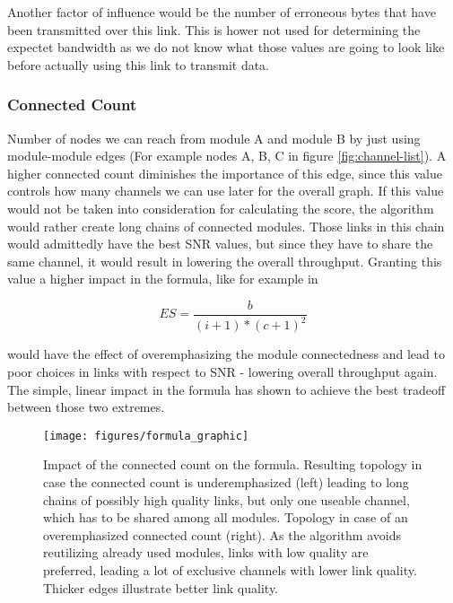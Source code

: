 	Another factor of influence would be the number of erroneous bytes that have been transmitted over this link. 
	This is hower not used for determining the expectet bandwidth as we do not know what those values are going to 
	look like before actually using this link to transmit data.
	
\newpage

      \subsubsection{Connected Count}
	Number of nodes we can reach from module A and module B by just using module-module edges (For example nodes A, B, C in figure \ref{fig:channel-list}). 
	A higher connected count diminishes the importance of this edge, since this value controls how many channels we can use later for the overall graph.
	If this value would not be taken into consideration for calculating the score, the algorithm would rather create long chains of connected modules. 
	Those links in this chain would admittedly have the best \ac{SNR} values, but since they have to share the same channel, 
	it would result in lowering the overall throughput. Granting this value a higher impact in the formula, like for example in 
	
	\begin{equation}
	  ES=\frac{b}{(i + 1)* (c + 1)^2}
	\end{equation}
	
	would have the effect of overemphasizing the module connectedness and lead to poor choices in links with respect to \ac{SNR} - 
	lowering overall throughput again. The simple, linear impact in the formula has shown to achieve the best tradeoff between those two extremes.
	
	\begin{figure}[h!]
	  \centering
	  \texttt{[image: figures/formula\_graphic]}
	  \caption{Impact of the connected count on the formula. Resulting topology in case the connected count is underemphasized (left) leading
	    to long chains of possibly high quality links, but only one useable channel, which has to be shared among all modules.
	    Topology in case of an overemphasized connected count (right). As the algorithm avoids reutilizing already used modules,
	    links with low quality are preferred, leading a lot of exclusive channels with lower link quality. Thicker edges illustrate better link quality.}
	  \label{fig:formula_graphic}
	\end{figure}

